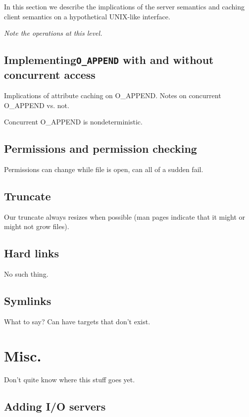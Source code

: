 \documentclass[10pt]{article} %
\begin{document}
In this section we describe the implications of the server semantics and
caching client semantics on a hypothetical UNIX-like interface.

\emph{Note the operations at this level.}

%
%
\subsection{Implementing\texttt{O\_APPEND} with and without concurrent access}

Implications of attribute caching on O\_APPEND.  Notes on concurrent O\_APPEND
vs. not.

Concurrent O\_APPEND is nondeterministic.

\subsection{Permissions and permission checking}

Permissions can change while file is open, can all of a sudden fail.

\subsection{Truncate}

Our truncate always resizes when possible (man pages indicate that it might or
might not grow files).

\subsection{Hard links}

No such thing.

\subsection{Symlinks}

What to say?  Can have targets that don't exist.


\section{Misc.}

Don't quite know where this stuff goes yet.

\subsection{Adding I/O servers}
\end{document}
